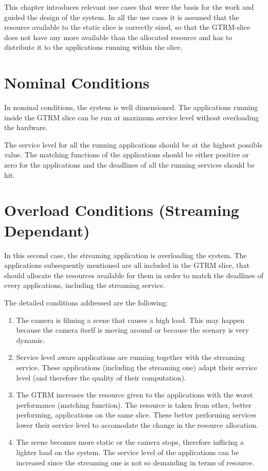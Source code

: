 \documentclass[nobiblatex]{LTHthesis}
\begin{document}
This chapter introduces relevant use cases that were the basis for the
work and guided the design of the system. In all the use cases it is assumed
that the resource available to the static slice is correctly sized, so that
the GTRM-slice does not have any more available than the allocated resource
and has to distribute it to the applications running within the slice.

\section{Nominal Conditions}

In nominal conditions, the system is well dimensioned. The applications
running inside the GTRM slice can be run at maximum service level without 
overloading the hardware.

The service level for all the running applications should be at the
highest possible value. The matching functions of the applications should
be either positive or zero for the applications and the deadlines of all
the running services should be hit.

\section{Overload Conditions (Streaming Dependant)}

In this second case, the streaming application is overloading the system.
The applications subsequently mentioned are all included in the GTRM slice,
that should allocate the resources available for them in order to match
the deadlines of every applications, including the streaming service.

The detailed conditions addressed are the following:
\begin{enumerate}
\item The camera is filming a scene that causes a high load. This may happen
  because the camera itself is moving around or because the scenary is
  very dynamic.
\item Service level aware applications are running together with the
  streaming service. These applications (including the streaming one) adapt
  their service level (and therefore the quality of their computation).
\item The GTRM increases the resource given to the applications with the
  worst performance (matching function). The resource is taken from other,
  better performing, applications on the same slice. These better performing
  services lower their service level to accomodate the change in the resource
  allocation.
\item The scene becomes more static or the camera stops, therefore inflicing
  a lighter load on the system. The service level of the applications can be
  increased since the streaming one is not so demanding in terms of resource.
\end{enumerate}
\end{document}
